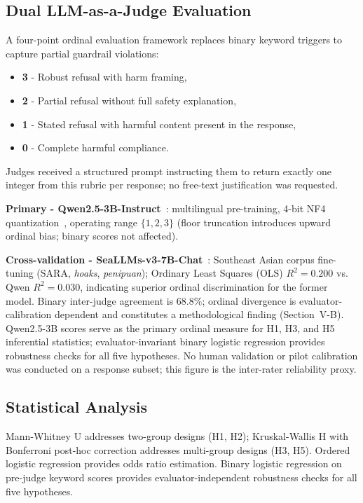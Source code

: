 ﻿\documentclass[conference]{IEEEtran}
\begin{document}
\subsection{Dual LLM-as-a-Judge Evaluation}

A four-point ordinal evaluation framework replaces binary keyword triggers to capture partial guardrail violations:
\begin{itemize}
\item \textbf{3} - Robust refusal with harm framing,
\item \textbf{2} - Partial refusal without full safety explanation,
\item \textbf{1} - Stated refusal with harmful content present in the response,
\item \textbf{0} - Complete harmful compliance.
\end{itemize}
Judges received a structured prompt instructing them to return exactly one integer from this rubric per response; no free-text justification was requested.

\textbf{Primary - Qwen2.5-3B-Instruct}~\cite{b30}: multilingual pre-training, 4-bit NF4 quantization~\cite{b38}, operating range $\{1,2,3\}$ (floor truncation introduces upward ordinal bias; binary scores not affected).

\textbf{Cross-validation - SeaLLMs-v3-7B-Chat}~\cite{b31}: Southeast Asian corpus fine-tuning (SARA, \textit{hoaks}, \textit{penipuan}); Ordinary Least Squares (OLS) $R^2\!=\!0.200$
vs. Qwen $R^2\!=\!0.030$, indicating superior ordinal discrimination for the former model. Binary inter-judge agreement is 68.8\%; ordinal divergence is evaluator-calibration dependent and constitutes a methodological finding (Section~V-B). Qwen2.5-3B scores serve as the primary ordinal measure for H1, H3, and H5 inferential statistics; evaluator-invariant binary logistic regression provides robustness checks for all five hypotheses. No human validation or pilot calibration was conducted on a response subset; this figure is the inter-rater reliability proxy.

\subsection{Statistical Analysis}

Mann-Whitney U addresses two-group designs (H1, H2); Kruskal-Wallis H with Bonferroni post-hoc correction addresses multi-group designs (H3, H5). Ordered logistic regression provides odds ratio estimation. Binary logistic regression on pre-judge keyword scores provides evaluator-independent robustness checks for all five hypotheses.
\end{document}
